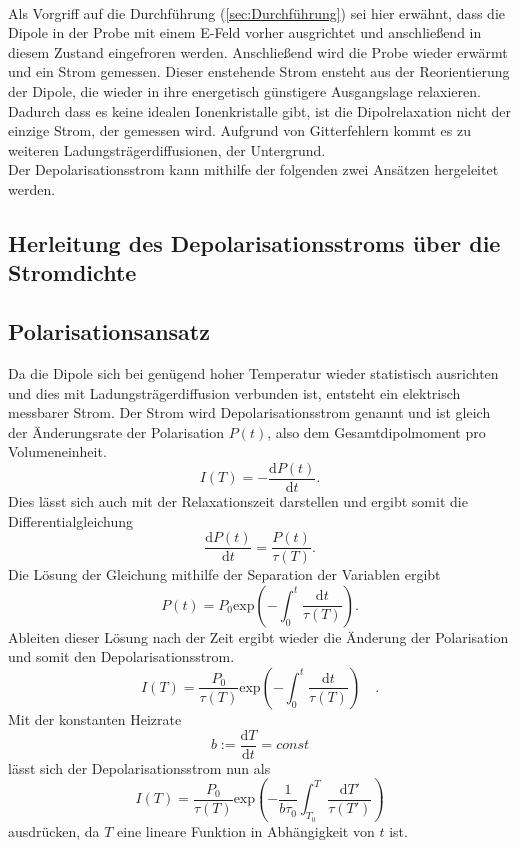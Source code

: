\\ 
Als Vorgriff auf die Durchführung (\ref{sec:Durchführung}) sei hier erwähnt, dass die Dipole in der Probe
mit einem E-Feld vorher ausgrichtet und anschließend in diesem Zustand eingefroren werden. Anschließend
wird die Probe wieder erwärmt und ein Strom gemessen. Dieser enstehende Strom ensteht aus der Reorientierung
der Dipole, die wieder in ihre energetisch günstigere Ausgangslage relaxieren. Dadurch dass es keine idealen Ionenkristalle
gibt, ist die Dipolrelaxation nicht der einzige Strom, der gemessen wird. Aufgrund von Gitterfehlern kommt es zu weiteren
Ladungsträgerdiffusionen, der Untergrund. \\
Der Depolarisationsstrom kann mithilfe der folgenden zwei Ansätzen hergeleitet werden.

\subsection{Herleitung des Depolarisationsstroms über die Stromdichte}
\label{Subsec:HerStromdichte}



\subsection{Polarisationsansatz}
\label{subsec:polarisation}

Da die Dipole sich bei genügend hoher Temperatur wieder statistisch ausrichten und dies mit Ladungsträgerdiffusion verbunden ist,
entsteht ein elektrisch messbarer Strom.
Der Strom wird Depolarisationsstrom genannt und ist gleich der Änderungsrate der 
Polarisation $P(t)$, also dem Gesamtdipolmoment pro Volumeneinheit.
\begin{equation}
    I(T) = - \frac{\text{d}P(t)}{\text{d}t}.
\end{equation}
Dies lässt sich auch mit der Relaxationszeit darstellen und ergibt somit die Differentialgleichung
\begin{equation}
    \frac{\text{d} P(t)}{\text{d} t} = \frac{P(t)}{\tau(T)}.
    \label{eqn:diff}
\end{equation}
Die Lösung der Gleichung mithilfe der Separation der Variablen ergibt
\begin{equation}
    P(t) = P_0 \text{exp}\left(-\int_0^t\frac{\text{d}t}{\tau(T)}\right).
\end{equation}
Ableiten dieser Lösung nach der Zeit ergibt wieder die Änderung der Polarisation und somit den 
Depolarisationsstrom.
\begin{equation}
    I(T) = \frac{P_0}{\tau(T)} \text{exp}\left(-\int_0^t\frac{\text{d}t}{\tau(T)}\right) \quad.
    \end{equation}
Mit der konstanten Heizrate
\begin{equation}
    b := \frac{\text{d}T}{\text{d}t} = const
\end{equation}
lässt sich der Depolarisationsstrom nun als 
\begin{equation}
    I(T) = \frac{P_0}{\tau(T)} \text{exp}\left(-\frac{1}{b\tau_0}\int_{T_0}^T\frac{\text{d}T'}{\tau(T')}\right)
\end{equation}
ausdrücken, da $T$ eine lineare Funktion in Abhängigkeit von $t$ ist.

